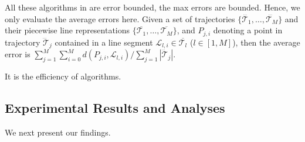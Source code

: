 All these algorithms in  are error bounded, \ie the max errors are bounded. Hence, we only evaluate the average errors here. Given a set of trajectories $\{\dddot{\mathcal{T}_1}, \ldots, \dddot{\mathcal{T}_M}\}$ and their piecewise line representations
$\{\overline{\mathcal{T}_1}, \ldots, \overline{\mathcal{T}_M}\}$, and $P_{j,i}$ denoting
a point in trajectory $\dddot{\mathcal{T}}_j$ contained in a line segment $\mathcal{L}_{l,i}\in\overline{\mathcal{T}_l}$ ($l\in[1,M]$),
then the average error is $\sum_{j=1}^{M}\sum_{i=0}^{M} d(P_{j,i},
\mathcal{L}_{l,i})/\sum_{j=1}^{M}{|\dddot{\mathcal{T}}_j |}$.

It is the efficiency of algorithms.

\subsection{Experimental Results and Analyses}
We next present our findings.



